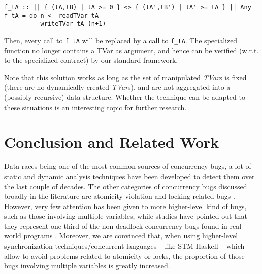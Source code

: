 \documentclass[submission,copyright,creativecommons]{eptcs}
\begin{document}
\newcommand{\tun}{tA}
\newcommand{\tdeux}{tB}
\begin{footnotesize}
\begin{verbatim}
f_tA :: || { (tA,tB) | tA >= 0 } <> { (tA',tB') | tA' >= tA } || Any 
f_tA = do n <- readTVar tA
          writeTVar tA (n+1)
\end{verbatim}
\end{footnotesize}
Then, every call to \texttt{f tA} will be replaced by a call to \texttt{f\_tA}. The specialized function no longer contains a TVar as argument, and hence can be verified (w.r.t. to the specialized contract) by our standard framework.

Note that this solution works as long as the set of manipulated \emph{TVar}s is fixed (there are no dynamically created \emph{TVar}s), and are not aggregated into a (possibly recursive) data structure. Whether the technique can be adapted to these situations is an interesting topic for further research.



\section{Conclusion and Related Work}
\label{conclusion}





Data races being one of the most common sources of concurrency bugs, a lot of static \cite{survey-methods-preventing,effective-static-race,warlock-static-data,racerx-effective-static,kiss-keep-simple,race-checking-context,automated-type-based,locksmith-context-sensitive,type-based-race,ownership-types-safe,programming-model-concurrent} and dynamic \cite{literace-effective-sampling,eraser-dynamic-data,hybrid-dynamic-data,racetrack-efficient-detection,goldilocks-race-transaction,randomized-active-atomicity} analysis techniques have been developed to detect them \cite{optimal-tracing-replay} over the last couple of decades. 
The other categories of concurrency bugs discussed broadly in the literature are atomicity violation \cite{type-effect-system,avio-detecting-atomicity,atom-aid-detecting} and locking-related bugs \cite{eraser-dynamic-data}. 
However, very few attention has been given to more higher-level kind of bugs, such as those involving multiple variables, while studies have pointed out that they represent one third of the non-deadlock concurrency bugs found in real-world programs \cite{learning-mistakes-comprehensive}. 
Moreover, we are convinced that, when using higher-level synchronization techniques/concurrent languages -- like STM Haskell -- which allow to avoid problems related to atomicity or locks, the proportion of those bugs involving multiple variables is greatly increased.   
\end{document}
